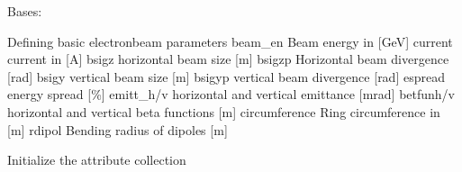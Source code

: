 \documentclass[letterpaper,10pt,english]{sphinxmanual}
\begin{document}
\begin{fulllineitems}
\label{\detokenize{autoapi/unduwave/wave_modules/wave_parameters/index:unduwave.wave_modules.wave_parameters.ebeam_parameters}}
\pysigstartsignatures
{}
\pysigstopsignatures
\sphinxAtStartPar
Bases: {\hyperref[\detokenize{autoapi/unduwave/attribute_classes/attributes/index:unduwave.attribute_classes.attributes._attribute_collection}]{}}

\sphinxAtStartPar
Defining basic electron\sphinxhyphen{}beam parameters
beam\_en \sphinxhyphen{} Beam energy in {[}GeV{]}
current \sphinxhyphen{} current in {[}A{]}
bsigz \sphinxhyphen{} horizontal beam size {[}m{]}
bsigzp \sphinxhyphen{} Horizontal beam divergence {[}rad{]}
bsigy \sphinxhyphen{} vertical beam size {[}m{]}
bsigyp \sphinxhyphen{} vertical beam divergence {[}rad{]}
espread \sphinxhyphen{} energy spread {[}\%{]}
emitt\_h/v \sphinxhyphen{} horizontal and vertical emittance {[}mrad{]}
betfunh/v \sphinxhyphen{} horizontal and vertical beta functions {[}m{]}
circumference \sphinxhyphen{} Ring circumference in {[}m{]}
rdipol \sphinxhyphen{} Bending radius of dipoles {[}m{]}

\sphinxAtStartPar
Initialize the attribute collection

\begin{fulllineitems}
\label{\detokenize{autoapi/unduwave/wave_modules/wave_parameters/index:unduwave.wave_modules.wave_parameters.ebeam_parameters.beam_en}}
\pysigstartsignatures
{}
\pysigstopsignatures
\end{fulllineitems}


\begin{fulllineitems}
\label{\detokenize{autoapi/unduwave/wave_modules/wave_parameters/index:unduwave.wave_modules.wave_parameters.ebeam_parameters.current}}
\pysigstartsignatures
{}
\pysigstopsignatures
\end{fulllineitems}


\end{fulllineitems}
\end{document}
